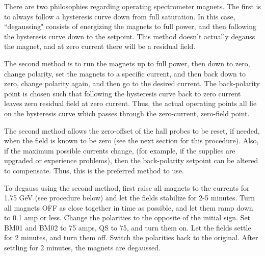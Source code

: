 There are two philosophies regarding operating spectrometer magnets. The first
is to always follow a hysteresis curve down from full saturation. In this case,
``degaussing" consists of energizing the magnets to full power, and then
following the hysteresis curve down to the setpoint. This method doesn't
actually degauss the magnet, and at zero current there will be a residual field.

The second method is to run the magnets up to full power, then down to zero,
change polarity, set the magnets to a specific current, and then back down to
zero, change polarity again, and then go to the desired current. The
back-polarity point is chosen such that following the hysteresis curve back to
zero current leaves zero residual field at zero current. Thus, the actual
operating points all lie on the hysteresis curve which passes through the
zero-current, zero-field point.

The second method allows the zero-offset of the hall probes to be reset, if
needed, when the field is known to be zero (see the next section for this
procedure). Also, if the maximum possible
currents change, (for example, if the supplies are upgraded or experience
problems), then the back-polarity setpoint can be altered to compensate.
Thus, this is the preferred method to use.

To degauss using the second method, first raise all magnets to the currents for
1.75 GeV (see procedure below) and let the fields stabilize for 2-5 minutes.
Turn all magnets OFF as close together in time as possible, and let them ramp
down to 0.1 amp or less. Change the polarities to the opposite of the initial
sign. Set BM01 and BM02 to 75 amps, QS to 75, and turn them on. Let the fields
settle for 2 minutes, and turn them off. Switch the polarities back to the
original. After settling for 2 minutes, the magnets are degaussed.
\vfil\eject
%


